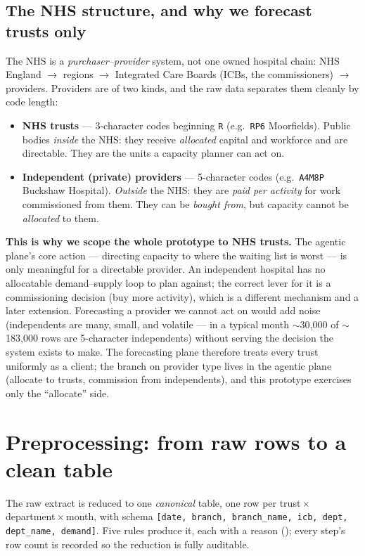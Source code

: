 \documentclass[11pt,a4paper]{article}
\newcommand{\code}[1]{\texttt{\small #1}}
\begin{document}
\subsection{The NHS structure, and why we forecast trusts only}\label{sec:trusts}
The NHS is a \emph{purchaser--provider} system, not one owned hospital chain:
NHS England $\rightarrow$ regions $\rightarrow$ Integrated Care Boards (ICBs, the commissioners)
$\rightarrow$ providers. Providers are of two kinds, and the raw data separates them cleanly by code
length:
\begin{itemize}[nosep]
  \item \textbf{NHS trusts} --- 3-character codes beginning \code{R} (e.g.\ \code{RP6} Moorfields).
        Public bodies \emph{inside} the NHS: they receive \emph{allocated} capital and workforce and are
        directable. They are the units a capacity planner can act on.
  \item \textbf{Independent (private) providers} --- 5-character codes (e.g.\ \code{A4M8P} Buckshaw
        Hospital). \emph{Outside} the NHS: they are \emph{paid per activity} for work commissioned from
        them. They can be \emph{bought from}, but capacity cannot be \emph{allocated} to them.
\end{itemize}
\textbf{This is why we scope the whole prototype to NHS trusts.} The agentic plane's core action ---
directing capacity to where the waiting list is worst --- is only meaningful for a directable provider.
An independent hospital has no allocatable demand--supply loop to plan against; the correct lever for it
is a commissioning decision (buy more activity), which is a different mechanism and a later extension.
Forecasting a provider we cannot act on would add noise (independents are many, small, and volatile ---
in a typical month $\sim$30{,}000 of $\sim$183{,}000 rows are 5-character independents) without serving
the decision the system exists to make. The forecasting plane therefore treats every trust uniformly as
a client; the branch on provider type lives in the agentic plane (allocate to trusts, commission from
independents), and this prototype exercises only the ``allocate'' side.

\section{Preprocessing: from raw rows to a clean table}\label{sec:prep}
The raw extract is reduced to one \emph{canonical} table, one row per
trust\,$\times$\,department\,$\times$\,month, with schema
\code{[date, branch, branch\_name, icb, dept, dept\_name, demand]}. Five rules produce it, each with a
reason (); every step's row count is recorded so the reduction is fully auditable.
\end{document}
